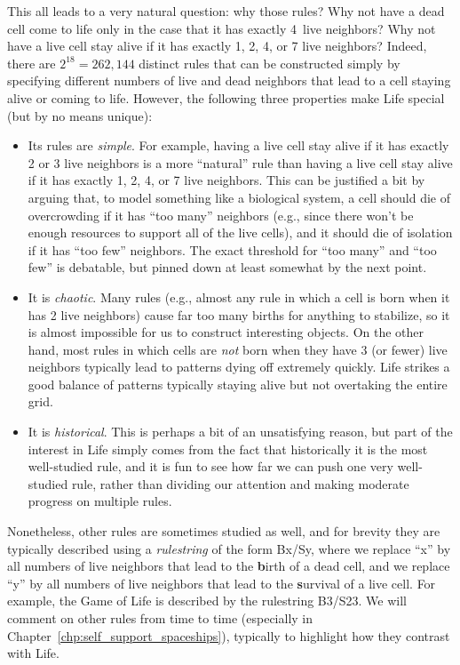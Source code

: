 This all leads to a very natural question: why those rules? Why not have a dead cell come to life only in the case that it has exactly 4~live neighbors? Why not have a live cell stay alive if it has exactly 1, 2, 4, or 7 live neighbors? Indeed, there are $2^{18} = 262,144$ distinct rules that can be constructed simply by specifying different numbers of live and dead neighbors that lead to a cell staying alive or coming to life. However, the following three properties make Life special (but by no means unique):\smallskip

\begin{itemize}
	\item Its rules are \emph{simple}. For example, having a live cell stay alive if it has exactly 2 or 3 live neighbors is a more ``natural'' rule than having a live cell stay alive if it has exactly 1, 2, 4, or 7 live neighbors. This can be justified a bit by arguing that, to model something like a biological system, a cell should die of overcrowding if it has ``too many'' neighbors (e.g., since there won't be enough resources to support all of the live cells), and it should die of isolation if it has ``too few'' neighbors. The exact threshold for ``too many'' and ``too few'' is debatable, but pinned down at least somewhat by the next point.\smallskip
	
	\item It is \emph{chaotic}. Many rules (e.g., almost any rule in which a cell is born when it has 2 live neighbors) cause far too many births for anything to stabilize, so it is almost impossible for us to construct interesting objects. On the other hand, most rules in which cells are \emph{not} born when they have $3$ (or fewer) live neighbors typically lead to patterns dying off extremely quickly. Life strikes a good balance of patterns typically staying alive but not overtaking the entire grid.\smallskip
	
	\item It is \emph{historical}. This is perhaps a bit of an unsatisfying reason, but part of the interest in Life simply comes from the fact that historically it is the most well-studied rule, and it is fun to see how far we can push one very well-studied rule, rather than dividing our attention and making moderate progress on multiple rules.\smallskip
\end{itemize}

Nonetheless, other rules are sometimes studied as well, and for brevity they are typically described using a \emph{rulestring} of the form Bx/Sy, where we replace ``x'' by all numbers of live neighbors that lead to the \textbf{b}irth of a dead cell, and we replace ``y'' by all numbers of live neighbors that lead to the \textbf{s}urvival of a live cell. For example, the Game of Life is described by the rulestring B3/S23. We will comment on other rules from time to time (especially in Chapter~\ref{chp:self_support_spaceships}), typically to highlight how they contrast with Life.

